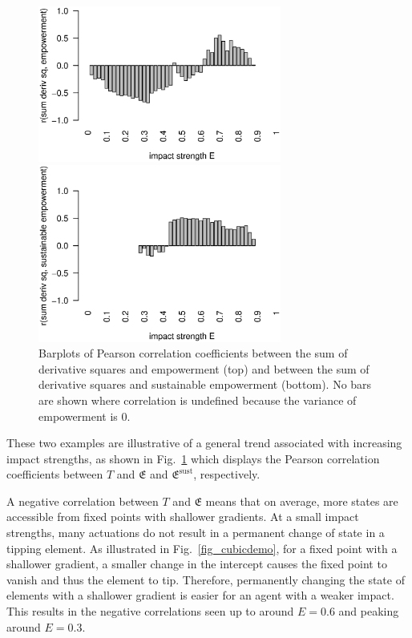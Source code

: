 \documentclass[conference]{IEEEtran}
\newcommand{\empowerment}{\ensuremath{\mathfrak{E}}}
\newcommand{\sustainableempowerment}{\ensuremath{\empowerment^{\mathrm{sust}}}}
\newcommand{\sumderivsquares}{\ensuremath{T}}
\newcommand{\impactstrength}{\ensuremath{E}}
\begin{document}
\begin{figure}

  \begin{center}

    \includegraphics[width=8cm]{n08_full_small_corr_dss_emp.eps}

    \includegraphics[width=8cm]{n08_full_small_corr_dss_empsust.eps}

  \end{center}

  \caption{Barplots of Pearson correlation coefficients between the
    sum of derivative squares and empowerment (top) and between the
    sum of derivative squares and sustainable empowerment (bottom). No
    bars are shown where correlation is undefined because the variance
    of empowerment is $0$.}
  \label{fig_dssempcorr}

\end{figure}

These two examples are illustrative of a general trend associated with
increasing impact strengths, as shown in Fig.~\ref{fig_dssempcorr}
which displays the Pearson correlation coefficients between
$\sumderivsquares$ and $\empowerment$ and $\sustainableempowerment$,
respectively.

A negative correlation between $\sumderivsquares$ and $\empowerment$
means that on average, more states are accessible from fixed points
with shallower gradients. At a small impact strengths, many actuations
do not result in a permanent change of state in a tipping element. As
illustrated in Fig.~\ref{fig_cubicdemo}, for a fixed point with a
shallower gradient, a smaller change in the intercept causes the fixed
point to vanish and thus the element to tip. Therefore, permanently
changing the state of elements with a shallower gradient is easier for
an agent with a weaker impact. This results in the negative
correlations seen up to around $\impactstrength = 0.6$ and peaking around $\impactstrength = 0.3$.
\end{document}
